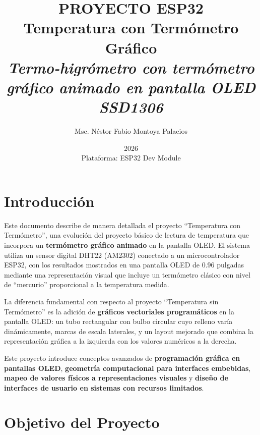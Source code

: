 \documentclass[12pt,a4paper]{article}
\title{\Huge\textbf{PROYECTO ESP32} \\ \Large Temperatura con Termómetro Gráfico \\ \vspace{0.5cm} \normalsize \textit{Termo-higrómetro con termómetro gráfico animado en pantalla OLED SSD1306}}
\author{Msc. Néstor Fabio Montoya Palacios}
\date{2026 \\ \vspace{0.2cm} \small Plataforma: ESP32 Dev Module}
\begin{document}
\maketitle
\tableofcontents
\newpage

\section{Introducción}

Este documento describe de manera detallada el proyecto ``Temperatura con Termómetro'', una evolución del proyecto básico de lectura de temperatura que incorpora un \textbf{termómetro gráfico animado} en la pantalla OLED. El sistema utiliza un sensor digital DHT22 (AM2302) conectado a un microcontrolador ESP32, con los resultados mostrados en una pantalla OLED de 0.96 pulgadas mediante una representación visual que incluye un termómetro clásico con nivel de ``mercurio'' proporcional a la temperatura medida.

La diferencia fundamental con respecto al proyecto ``Temperatura sin Termómetro'' es la adición de \textbf{gráficos vectoriales programáticos} en la pantalla OLED: un tubo rectangular con bulbo circular cuyo relleno varía dinámicamente, marcas de escala laterales, y un layout mejorado que combina la representación gráfica a la izquierda con los valores numéricos a la derecha.

Este proyecto introduce conceptos avanzados de \textbf{programación gráfica en pantallas OLED}, \textbf{geometría computacional para interfaces embebidas}, \textbf{mapeo de valores físicos a representaciones visuales} y \textbf{diseño de interfaces de usuario en sistemas con recursos limitados}.

\section{Objetivo del Proyecto}
\end{document}
